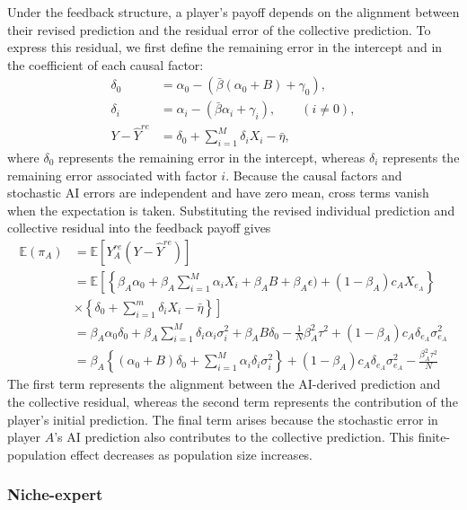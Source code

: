 \documentclass[12pt]{article}
\begin{document}
Under the feedback structure, a player's payoff depends on the alignment between their revised prediction and the residual error of the collective prediction. 
To express this residual, we first define the remaining error in the intercept and in the coefficient of each causal factor:
\begin{align}
\delta_0 &= \alpha_0- (\bar{\beta}(\alpha_0 + B) + \gamma_0),\\
\delta_i &= \alpha_i- (\bar{\beta}\alpha_i + \gamma_i), \qquad (i \neq 0),\\
Y - \hat{Y}^{re} &= \delta_0 + \sum_{i = 1}^{M}\delta_iX_i - \bar{\eta},
\end{align}
where $\delta_0$ represents the remaining error in the intercept, whereas $\delta_i$ represents the remaining error associated with factor $i$. 
Because the causal factors and stochastic AI errors are independent and have zero mean, cross terms vanish when the expectation is taken. Substituting the revised individual prediction and collective residual into the feedback payoff gives
\begin{align}
\mathbb{E}(\pi_A)
&= \mathbb{E}[Y_A^{re}(Y - \hat{Y}^{re})] \\
&= \mathbb{E}\left[\left\{\beta_A \alpha_0 + \beta_A \sum_{i = 1}^{M} \alpha_i X_i + \beta_A B  + \beta_A \epsilon) + (1 - \beta_A)c_AX_{e_A}\right\}\right.\\
&\times \left.\left\{\delta_0 + \sum_{i = 1}^{m}\delta_iX_i - \bar{\eta}\right\}\right] \\
&= \beta_A\alpha_0\delta_0 + \beta_A\sum_{i = 1}^{M}\delta_i\alpha_i\sigma_i^2 + \beta_AB\delta_0 - \frac{1}{N}\beta_A^2\tau^2 + (1-\beta_A)c_A\delta_{e_A}\sigma_{e_A}^2\\
&= \beta_A\left\{(\alpha_0+B)\delta_0 + \sum_{i = 1}^{M}\alpha_i\delta_i\sigma_i^2\right\} + (1-\beta_A)c_A\delta_{e_A}\sigma_{e_A}^2 - \frac{\beta_A^2\tau^2}{N}
\end{align}
The first term represents the alignment between the AI-derived prediction and the collective residual, whereas the second term represents the contribution of the player's initial prediction. The final term arises because the stochastic error in player $A$'s AI prediction also contributes to the collective prediction. This finite-population effect decreases as population size increases.

\subsubsection*{Niche-expert}
\end{document}
